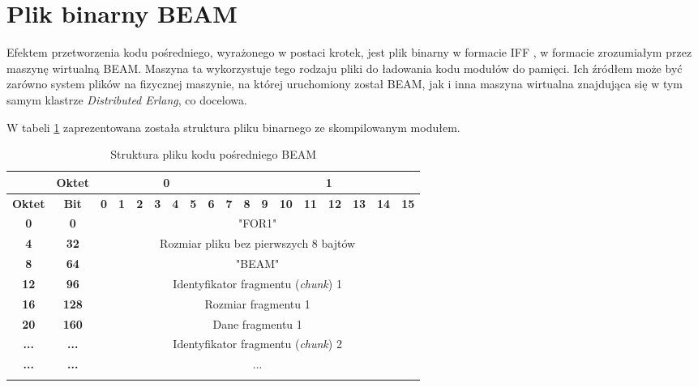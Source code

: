 \section{Plik binarny BEAM}

Efektem przetworzenia kodu pośredniego, wyrażonego w postaci krotek, jest plik binarny w formacie IFF \cite{morrison1985ea}, w formacie zrozumiałym przez maszynę wirtualną BEAM. Maszyna ta wykorzystuje tego rodzaju pliki do ładowania kodu modułów do pamięci. Ich źródłem może być zarówno system plików na fizycznej maszynie, na której uruchomiony został BEAM, jak i inna maszyna wirtualna znajdująca się w tym samym klastrze \emph{Distributed Erlang}, co docelowa.

W tabeli \ref{table:beamFile} zaprezentowana została struktura pliku binarnego ze skompilowanym modułem.

\begin{longtable}{|c|c|c|c|c|c|c|c|c|c|c|c|c|c|c|c|c|c|}
\hline
         & \textbf{Oktet} & \multicolumn{8}{|c|}{\textbf{0}} & \multicolumn{8}{|c|}{\textbf{1}} \\
\hline
\textbf{Oktet} & \textbf{Bit} & \textbf{0} & \textbf{1} & \textbf{2} & \textbf{3} & \textbf{4} & \textbf{5} & \textbf{6} & \textbf{7} & \textbf{8} & \textbf{9} & \textbf{10} & \textbf{11} & \textbf{12} & \textbf{13} & \textbf{14} & \textbf{15}\\
\hline
\textbf{0} & \textbf{0} & \multicolumn{16}{|c|}{"FOR1"} \\[2ex]
\hline
\textbf{4} & \textbf{32} & \multicolumn{16}{|c|}{Rozmiar pliku bez pierwszych 8 bajtów}\\[2ex]
\hline
\textbf{8} & \textbf{64} & \multicolumn{16}{|c|}{"BEAM"} \\[2ex]
\hline
\textbf{12} & \textbf{96} & \multicolumn{16}{|c|}{Identyfikator fragmentu (\emph{chunk}) 1}\\[2ex]
\hline
\textbf{16} & \textbf{128} & \multicolumn{16}{|c|}{Rozmiar fragmentu 1} \\[2ex]
\hline
\textbf{20} & \textbf{160} & \multicolumn{16}{|c|}{Dane fragmentu 1} \\[10ex]
\hline
\textbf{...} & \textbf{...} & \multicolumn{16}{|c|}{Identyfikator fragmentu (\emph{chunk}) 2}\\[2ex]
\hline
\textbf{...} & \textbf{...} & \multicolumn{16}{|c|}{...} \\
\hline
\caption{Struktura pliku kodu pośredniego BEAM}
\label{table:beamFile} \\
\end{longtable}

